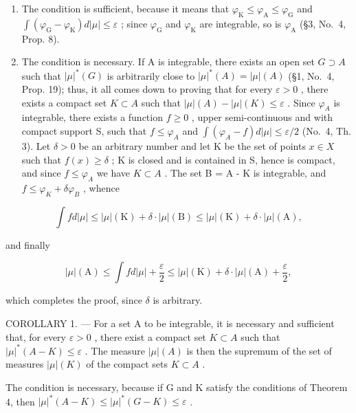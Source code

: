 \begin{enumerate}
\def\labelenumi{\alph{enumi})}
\item
  The condition is sufficient, because it means that \(\varphi_{\mathrm{K}} \leqslant \varphi_{\mathrm{A}} \leqslant \varphi_{\mathrm{G}}\) and \(\int (\varphi_{\mathrm{G}} - \varphi_{\mathrm{K}}) d|\mu| \leqslant \varepsilon\) ; since \(\varphi_{\mathrm{G}}\) and \(\varphi_{\mathrm{K}}\) are integrable, so is \(\varphi_{\mathrm{A}}\) (§3, No.~4, Prop. 8).
\item
  The condition is necessary. If A is integrable, there exists an open set \(G \supset A\) such that \(|\mu|^{*}(G)\) is arbitrarily close to \(|\mu|^{*}(A) = |\mu|(A)\) (§1, No.~4, Prop. 19); thus, it all comes down to proving that for every \(\varepsilon > 0\) , there exists a compact set \(K \subset A\) such that \(|\mu|(A) - |\mu|(K) \leqslant \varepsilon\) . Since \(\varphi_{A}\) is integrable, there exists a function \(f \geqslant 0\) , upper semi-continuous and with compact support S, such that \(f \leqslant \varphi_{A}\) and \(\int(\varphi_{A} - f)d|\mu| \leqslant \varepsilon/2\) (No.~4, Th. 3). Let \(\delta > 0\) be an arbitrary number and let K be the set of points \(x \in X\) such that \(f(x) \geqslant \delta\) ; K is closed and is contained in S, hence is compact, and since \(f \leqslant \varphi_{A}\) we have \(K \subset A\) . The set B = A - K is integrable, and \(f \leqslant \varphi_{K} + \delta\varphi_{B}\) , whence
\end{enumerate}

\[
\int f d | \mu | \leqslant | \mu | (\mathrm{K}) + \delta \cdot | \mu | (\mathrm{B}) \leqslant | \mu | (\mathrm{K}) + \delta \cdot | \mu | (\mathrm{A}),
\]

and finally

\[
| \mu | (\mathrm{A}) \leqslant \int f d | \mu | + \frac {\varepsilon}{2} \leqslant | \mu | (\mathrm{K}) + \delta \cdot | \mu | (\mathrm{A}) + \frac {\varepsilon}{2},
\]

which completes the proof, since \(\delta\) is arbitrary.

COROLLARY 1. --- For a set A to be integrable, it is necessary and sufficient that, for every \(\varepsilon > 0\) , there exist a compact set \(K \subset A\) such that \(|\mu|^*(A - K) \leqslant \varepsilon\) . The measure \(|\mu|(A)\) is then the supremum of the set of measures \(|\mu|(K)\) of the compact sets \(K \subset A\) .

The condition is necessary, because if G and K satisfy the conditions of Theorem 4, then \(|\mu|^{*}(A - K) \leqslant |\mu|^{*}(G - K) \leqslant \varepsilon\) .

